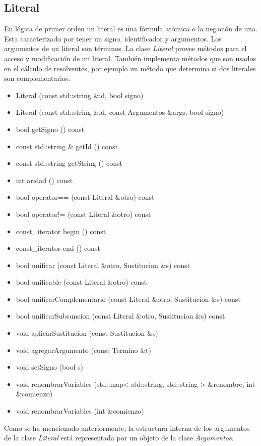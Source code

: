 \documentclass[a4paper,12pt]{article}
\begin{document}
\subsection{Literal}
En lógica de primer orden un literal es una fórmula atómica o la negación de una.
Esta caracterizado por tener un signo, identificador y argumentos. Los argumentos
de un literal son términos.
La clase \emph{Literal} provee métodos para el acceso y modificación de un literal. También
implementa métodos que son usados en el cálculo de resolventes, por ejemplo un método que determina
si dos literales son complementarios.
\begin{itemize}
\renewcommand{\labelitemi}{$\bullet$}
\item Literal (const std::string \&id, bool signo)
\item Literal (const std::string \&id, const Argumentos \&args, bool signo)
\item bool getSigno () const
\item const std::string \& getId () const
\item const std::string getString () const
\item int aridad () const
\item bool operator== (const Literal \&otro) const
\item bool operator!= (const Literal \&otro) const
\item const\_iterator begin () const
\item const\_iterator end () const
\item bool unificar (const Literal \&otro, Sustitucion \&s) const
\item bool unificable (const Literal \&otro) const
\item bool unificarComplementario (const Literal \&otro, Sustitucion \&s) const
\item bool unificarSubsuncion (const Literal \&otro, Sustitucion \&s) const
\item void aplicarSustitucion (const Sustitucion \&s)
\item void agregarArgumento (const Termino \&t)
\item void setSigno (bool s)
\item void renombrarVariables (std::map< std::string, std::string > \&renombre, int \&comienzo)
\item void renombrarVariables (int \&comienzo)
\end{itemize}
Como se ha mencionado anteriormente, la estructura interna de los argumentos de la clase
\emph{Literal} está representada por un objeto de la clase \emph{Argumentos}.
\end{document}
